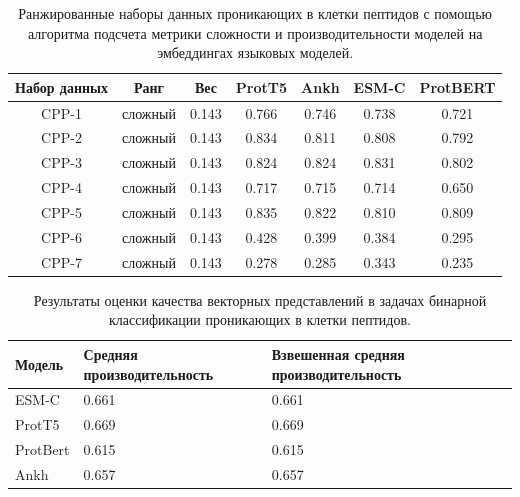 \documentclass[specification,annotation,times]{itmo-student-thesis}
\begin{document}
\begin{table}[h]
\centering
\caption{Ранжированные наборы данных проникающих в клетки пептидов с помощью алгоритма подсчета метрики сложности и производительности моделей на эмбеддингах языковых моделей.}
\label{tab:model_performance_ccp}

\begin{tabular}{|c|c|c|c|c|c|c|}
\hline
Набор данных & Ранг & Вес & ProtT5 & Ankh & ESM-C & ProtBERT \\
\hline
CPP-1 & сложный & 0.143 & 0.766 & 0.746 & 0.738 & 0.721 \\ \hline
CPP-2 & сложный & 0.143 & 0.834 & 0.811 & 0.808 & 0.792 \\ \hline
CPP-3 & сложный & 0.143 & 0.824 & 0.824 & 0.831 & 0.802 \\ \hline
CPP-4 & сложный & 0.143 & 0.717 & 0.715 & 0.714 & 0.650 \\ \hline
CPP-5 & сложный & 0.143 & 0.835 & 0.822 & 0.810 & 0.809 \\ \hline
CPP-6 & сложный & 0.143 & 0.428 & 0.399 & 0.384 & 0.295 \\ \hline
CPP-7 & сложный & 0.143 & 0.278 & 0.285 & 0.343 & 0.235 \\ \hline
\end{tabular}

\end{table}


\begin{table}[h]
\centering

\caption{Результаты оценки качества векторных представлений в задачах бинарной классификации проникающих в клетки пептидов.}
\label{tab:compare_results_ccp}
\begin{tabular}{|p{3cm}|p{5cm}|p{5cm}|}
\hline
Модель & Средняя \newline производительность & Взвешенная \newline средняя \newline производительность \\
\hline
ESM-C & 0.661 & 0.661 \\ \hline
ProtT5 & 0.669 & 0.669 \\ \hline
ProtBert & 0.615 & 0.615 \\ \hline
Ankh & 0.657 & 0.657 \\ \hline
\end{tabular}

\end{table}
\end{document}
